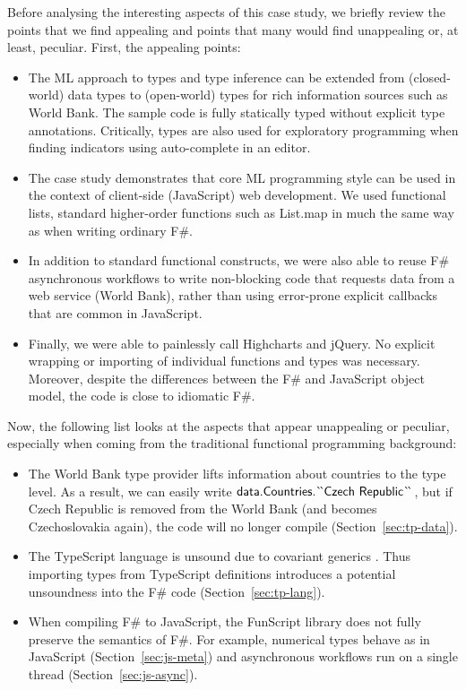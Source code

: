 \documentclass[submission,copyright,creativecommons]{eptcs}
\newcommand{\ident}[1]{\textnormal{\sffamily #1}}
\newcommand{\lident}[1]{\textnormal{\sffamily 
  \`{}\hspace{-0.25em}\`{}\hspace{-0.1em}#1\`{}\hspace{-0.25em}\`{}}}
\begin{document}
Before analysing the interesting aspects of this case study, we briefly review the points that we 
find appealing and points that many would find unappealing or, at least, peculiar. First, the 
appealing points:

\begin{itemize}
\item The ML approach to types and type inference can be extended from (closed-world) data types 
  to (open-world) types for rich information sources such as World Bank. The sample code is 
  fully statically typed without explicit type annotations. Critically, types are also used for 
  exploratory programming when finding indicators using auto-complete in an editor.

\item The case study demonstrates that core ML programming style can be used in the context of
  client-side (JavaScript) web development. We used functional lists, standard higher-order 
  functions such as \ident{List.map} in much the same way as when writing ordinary F\#.

\item In addition to standard functional constructs, we were also able to reuse F\# asynchronous
  workflows to write non-blocking code that requests data from a web service (World Bank), 
  rather than using error-prone explicit callbacks that are common in JavaScript.

\item Finally, we were able to painlessly call Highcharts and jQuery. No explicit wrapping or 
  importing of individual functions and types was necessary. Moreover, despite the differences between 
  the F\# and JavaScript object model, the code is close to idiomatic F\#.
\end{itemize}

\noindent
Now, the following list looks at the aspects that appear unappealing or peculiar, especially when 
coming from the traditional functional programming background:

\begin{itemize}
\item The World Bank type provider lifts information about countries to the type level. As a result,
  we can easily write $\ident{data.Countries.}\lident{Czech Republic}$, but if Czech Republic is
  removed from the World Bank (and becomes Czechoslovakia again), the code will no longer compile
  (Section~\ref{sec:tp-data}).

\item The TypeScript language is unsound due to covariant generics \cite{ms-safets}. Thus
  importing types from TypeScript definitions introduces a potential unsoundness into the F\# 
  code (Section~\ref{sec:tp-lang}).

\item When compiling F\# to JavaScript, the FunScript library does not fully preserve the 
  semantics of F\#. For example, numerical types behave as in JavaScript (Section~\ref{sec:js-meta})
  and asynchronous workflows run on a single thread (Section~\ref{sec:js-async}).
\end{itemize}
\end{document}
